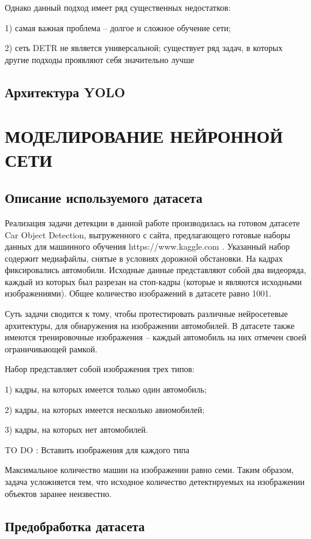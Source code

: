 \documentclass[14pt,a4paper]{extarticle}
\begin{document}
Однако данный подход имеет ряд существенных недостатков:

1) самая важная проблема -- долгое и сложное обучение сети;

2) сеть DETR не является универсальной; существует ряд задач, в которых другие подходы проявляют себя значительно лучше 

\newpage
\subsection{Архитектура YOLO}
\newpage
\section{МОДЕЛИРОВАНИЕ НЕЙРОННОЙ СЕТИ}
\subsection{Описание используемого датасета}
Реализация задачи детекции в данной работе производилась на готовом датасете Car Object Detection, выгруженного с сайта, предлагающего готовые наборы данных для машинного обучения https://www.kaggle.com \cite{dataset}. Указанный набор содержит медиафайлы, снятые в условиях дорожной обстановки. На кадрах фиксировались автомобили. Исходные данные представляют собой два видеоряда, каждый из которых был разрезан на стоп-кадры (которые и являются исходными изображениями). Общее количество изображений в датасете равно 1001.  

Суть задачи сводится к тому, чтобы протестировать различные нейросетевые архитектуры, для обнаружения на изображении автомобилей. В датасете также имеются тренировочные изображения -- каждый автомобиль на них отмечен своей ограничивающей рамкой. 

Набор представляет собой изображения трех типов:

1) кадры, на которых имеется только один автомобиль;

2) кадры, на которых имеется несколько авиомобилей;

3) кадры, на которых нет автомобилей.

TO DO : Вставить изображения для каждого типа

Максимальное количество машин на изображении равно семи. Таким образом, задача усложняется тем, что исходное количество детектируемых на изображении объектов заранее неизвестно.
\newpage
\subsection{Предобработка датасета}
\end{document}
